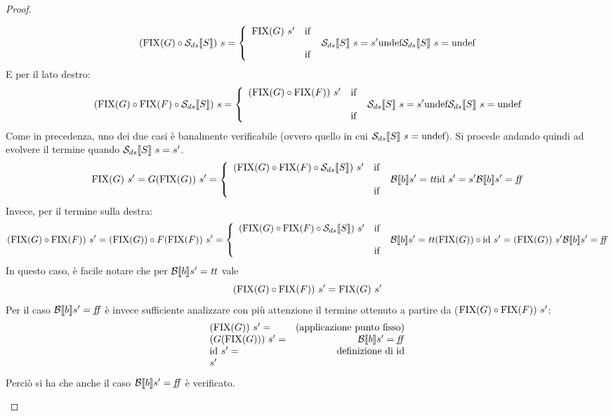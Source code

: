{\begin{proof}
\begin{itemize}
  $$
  (\fixp{G} \circ \dsCtxt{S})\ s
      = \caseFun{\fixp{G}\ s'}
                {\dsCtxt{S}\ s = s'}
                {\undefDS}
                {\dsCtxt{S}\ s = \undefDS}
  $$
  E per il lato destro:
  $$
  (\fixp{G} \circ \fixp{F} \circ \dsCtxt{S})\ s
      = \caseFun{(\fixp{G} \circ \fixp{F})\ s'}
                {\dsCtxt{S}\ s = s'}
                {\undefDS}
                {\dsCtxt{S}\ s = \undefDS}
  $$
  Come in precedenza, uno dei due casi è banalmente verificabile (ovvero quello
  in cui $\mathcal{S}_{ds}\llbracket S \rrbracket\ s = \textrm{\normalfont{undef}}$). Si procede andando quindi ad evolvere il
  termine quando $\mathcal{S}_{ds}\llbracket S \rrbracket\ s = s'$.
  $$
  \fixp{G}\ s' =
  G(\fixp{G})\ s' = \caseFun{(\fixp{G} \circ \fixp{F} \circ \dsCtxt{S})\ s'}
                        {\B{b}' = \semtrue}
                        {\idDS\ s' = s'}
                        {\B{b}' = \semfalse}
  $$
  Invece, per il termine sulla destra:
  $$
  (\fixp{G} \circ \fixp{F})\ s' =
  (\fixp{G}) \circ F (\fixp{F})\ s' =
                \caseFun{(\fixp{G} \circ \fixp{F} \circ \dsCtxt{S})\ s'}
                        {\B{b}' = \semtrue}
                        {(\fixp{G}) \circ \idDS\ s' = (\fixp{G})\ s'}
                        {\B{b}' = \semfalse}
  $$
  In questo caso, è facile notare che per $\mathcal{B} \llbracket b \rrbracket s' = \mbox{\textit{tt}}$ vale
  $$
  (\textrm{\normalfont{FIX}}(G) \circ \textrm{\normalfont{FIX}}(F))\ s' = \textrm{\normalfont{FIX}}(G)\ s'
  $$
  Per il caso $\mathcal{B} \llbracket b \rrbracket s' = \mbox{\textit{ff}}$ è invece sufficiente analizzare con più
  attenzione il termine ottenuto a partire da ($\textrm{\normalfont{FIX}}(G) \circ \textrm{\normalfont{FIX}}(F))\ s'$:
  $$
  \begin{array}{lr}
  (\textrm{\normalfont{FIX}}(G))\ s' = & (\text{applicazione punto fisso}) \\
  (G (\textrm{\normalfont{FIX}}(G)))\ s' = & \mathcal{B} \llbracket b \rrbracket s' = \mbox{\textit{ff}} \\
  \textrm{\normalfont{id}}\ s' = & \text{definizione di \textrm{\normalfont{id}}} \\
  s'
  \end{array}
  $$
  Perciò si ha che anche il caso $\mathcal{B} \llbracket b \rrbracket s' = \mbox{\textit{ff}}$ è verificato.



\end{itemize}
\end{proof}}
